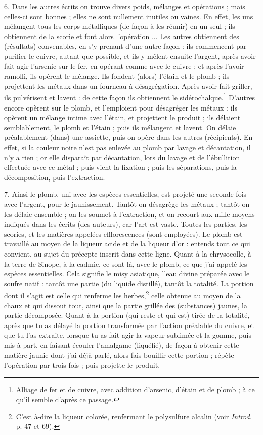 \documentclass[a4paper, 11pt, oneside, polutonikogreek, french]{article}
\begin{document}
6. Dans les autres écrits on trouve divers poids, mélanges et opérations ; mais celles-ci sont bonnes ; elles ne sont nullement inutiles ou vaines. En effet, les uns mélangent tous les corps métalliques (de façon à les réunir) en un seul ; ils obtiennent de la scorie et font alors l'opération ... Les autres obtiennent des (résultats) convenables, en s'y prenant d'une autre façon : ils commencent par purifier le cuivre, autant que possible, et ils y mêlent ensuite l'argent, après avoir fait agir l'arsenic sur le fer, en opérant comme avec le cuivre ; et après l'avoir ramolli, ils opèrent le mélange. Ils fondent (alors) l'étain et le plomb ; ils projettent les métaux dans un fourneau à désagrégation. Après avoir fait griller, ils pulvérisent et lavent : de cette façon ils obtiennent le sidérochalque.\footnote{Alliage de fer et de cuivre, avec addition d'arsenic, d'étain et de plomb ; à ce qu'il semble d'après ce passage.} D'autres encore opèrent sur le plomb, et l'emploient pour désagréger les métaux : ils opèrent un mélange intime avec l'étain, et projettent le produit ; ils délaient semblablement, le plomb et l'étain ; puis ils mélangent et lavent. On délaie préalablement (dans) une assiette, puis on opère dans les autres (récipients). En effet, si la couleur noire n'est pas enlevée au plomb par lavage et décantation, il n'y a rien ; or elle disparaît par décantation, lors du lavage et de l'ébullition effectuée avec ce métal ; puis vient la fixation ; puis les séparations, puis la décomposition, puis l'extraction.

7. Ainsi le plomb, uni avec les espèces essentielles, est projeté une seconde fois avec l'argent, pour le jaunissement. Tantôt on désagrège les métaux ; tantôt on les délaie ensemble ; on les soumet à l'extraction, et on recourt aux mille moyens indiqués dans les écrits (des auteurs), car l'art est vaste. Toutes les parties, les scories, et les matières appelées efflorescences (sont employées). Le plomb est travaillé au moyen de la liqueur acide et de la liqueur d'or : entends tout ce qui convient, au sujet du précepte inscrit dans cette ligne. Quant à la chrysocolle, à la terre de Sinope, à la cadmie, ce sont là, avec le plomb, ce que j'ai appelé les espèces essentielles. Cela signifie le misy asiatique, l'eau divine préparée avec le soufre natif : tantôt une partie (du liquide distillé), tantôt la totalité. La portion dont il s'agit est celle qui renferme les herbes,\footnote{C'est à-dire la liqueur colorée, renfermant le polysulfure alcalin (voir \emph{Introd.} p. 47 et 69).} celle obtenue au moyen de la chaux et qui dissout tout, ainsi que la partie grillée des (substances) jaunes, la partie décomposée. Quant à la portion (qui reste et qui est) tirée de la totalité, après que tu as délayé la portion transformée par l'action préalable du cuivre, et que tu l'as extraite, lorsque tu as fait agir la vapeur sublimée et la gomme, puis mis à part, en faisant écouler l'amalgame (liquéfié), de façon à obtenir cette matière jaunie dont j'ai déjà parlé, alors fais bouillir cette portion ; répète l'opération par trois fois ; puis projette le produit.
\end{document}
